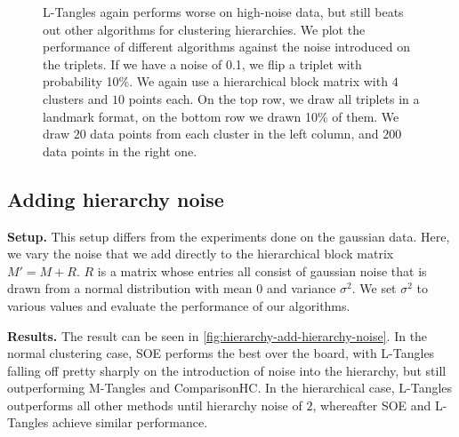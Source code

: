 \onecolumn
\begin{figure}[ht]
    \centering
    \hfill
    \caption{
        L-Tangles again performs worse on high-noise data, but still beats out other algorithms for clustering hierarchies.
        We plot the performance of different algorithms against the noise introduced on the triplets. 
        If we have a noise of 0.1, we flip a triplet with probability 10\%.  
        We again use a hierarchical block matrix with $4$ clusters and $10$ points each. 
        On the top row, we draw all triplets in a landmark format, on the bottom row we drawn 10\% of them.    
        We draw $20$ data points from each cluster in the left column, and $200$ data points in the right one.
    }
    \label{fig:hierarchy-add-triplet-noise}
\end{figure}

\subsection{Adding hierarchy noise}\label{sec:adding-hierarchy-noise}
\textbf{Setup.}
This setup differs from the experiments done on the gaussian data. Here, we vary the noise that we add directly to the hierarchical block matrix $M' = M + R$. 
$R$ is a matrix whose entries all consist of gaussian noise that is drawn from a normal distribution with mean $0$ and variance $\sigma^2$. We set $\sigma^2$ to various 
values and evaluate the performance of our algorithms. 

\noindent
\textbf{Results.}
The result can be seen in \autoref{fig:hierarchy-add-hierarchy-noise}. In the normal clustering case, 
SOE performs the best over the board, with L-Tangles
falling off pretty sharply on the introduction of noise into the hierarchy, but still outperforming M-Tangles and ComparisonHC. In the hierarchical case, L-Tangles outperforms all other methods until hierarchy noise of $2$, whereafter SOE and L-Tangles achieve similar performance. 


